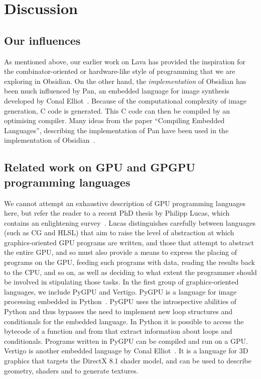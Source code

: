 
\section{Discussion} \label{sec:disc}
\subsection{Our influences}
As mentioned above, our earlier work on Lava has provided the inspiration for
the combinator-oriented or hardware-like style of programming that we are exploring in Obsidian.
On the other hand, the {\em implementation} of Obsidian has been much influenced by
{Pan}, an embedded language for image synthesis developed by 
Conal Elliot~\cite{PAN}. Because of the computational complexity of image generation, C 
code is generated. This C code can then be compiled by an optimising compiler. 
Many ideas from the paper 
``Compiling Embedded Languages'', describing the implementation of Pan have been 
used in the implementation of Obsidian~\cite{Elliott03:CompileDSEL-JFP}. 

\subsection{Related work on GPU and GPGPU programming languages}
We cannot attempt an exhaustive description of GPU programming languages here, but refer the reader to a recent PhD thesis by Philipp Lucas, which contains an enlightening survey~\cite{Lucas08}. Lucas distinguishes carefully between languages (such as CG and HLSL) that aim to raise the level of abstraction at which graphics-oriented GPU programs are written, and those that attempt to abstract the entire GPU, and so must also provide a means to express the placing of programs on the GPU, feeding such programs with data, reading the results back to the CPU, and so on, as well as deciding to what extent the programmer should be involved
in stipulating those tasks.
In the first group of graphics-oriented languages, we include PyGPU and Vertigo.
PyGPU is a language for image processing embedded in Python~\cite{LUNDPAPER}. 
PyGPU uses the introspective abilities of Python and thus bypasses
the need to implement new loop structures and conditionals for the embedded 
language. In Python it is possible to access the bytecode of a function and 
from that extract information about loops and conditionals. 
Programs written in PyGPU can be compiled and run on a GPU. 
Vertigo is another embedded language by Conal Elliot~\cite{VERTIGO}. It
is a language for 3D graphics that targets the DirectX 8.1 shader model, and
can be used to describe geometry, shaders and to generate textures. 

